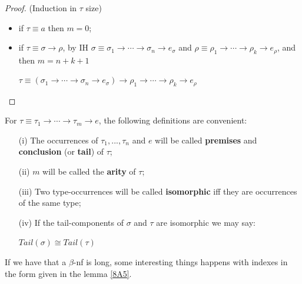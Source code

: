 \documentclass[a4paper,10pt]{article}
\begin{document}
\begin{proof}(Induction in $\tau$ size)\\

 \begin{itemize}
  \item if $\tau \equiv a$ then $m = 0$;
  \item if $\tau \equiv \sigma \to \rho$, by IH 
   $\sigma \equiv \sigma_1 \to \cdots \to \sigma_n \to e_{\sigma}$ and
   $\rho \equiv \rho_1 \to \cdots \to \rho_k \to e_{\rho}$, and then $m = n + k + 1$
   \begin{center}
   $\tau \equiv (\sigma_1 \to \cdots \to \sigma_n \to e_{\sigma}) \to \rho_1 \to \cdots \to \rho_k \to e_{\rho}$
   \end{center}
   
 \end{itemize}

\end{proof}


\begin{mydef}For $\tau \equiv \tau_1 \rightarrow \cdots \rightarrow \tau_m \rightarrow e$, the following definitions are convenient:
\begin{itemize}
 \item[(i)] The occurrences of $\tau_1,...,\tau_n$ and $e$ will be called \textbf{premises} and \textbf{conclusion} (or \textbf{tail}) of $\tau$;
 \item[(ii)] $m$ will be called the \textbf{arity} of $\tau$;
 \item[(iii)] Two type-occurrences will be called \textbf{isomorphic} iff they are occurrences of the same type;
 \item[(iv)] If the tail-components of $\sigma$ and $\tau$ are isomorphic we may say:
\begin{center}
 $Tail(\sigma) \cong Tail(\tau)$ 
\end{center}
\end{itemize}
\end{mydef}

\vspace*{0.5cm}

If we have that a $\beta$-nf is long, some interesting things happens with indexes in the form given in the lemma \ref{8A5}.
\end{document}
